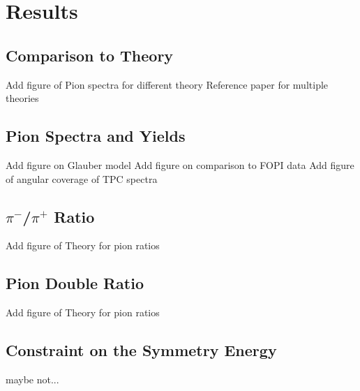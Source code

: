 \chapter{Results}
\section{Comparison to Theory}
Add figure of Pion spectra for different theory 
Reference paper for multiple theories
 
\section{Pion Spectra and Yields}
Add figure on Glauber model 
Add figure on comparison to FOPI data
Add figure of angular coverage of TPC spectra 

\section{$\pi^-$/$\pi^+$ Ratio}
Add figure of Theory for pion ratios

\section{Pion Double Ratio}
Add figure of Theory for pion ratios

\section{Constraint on the Symmetry Energy}
maybe not...